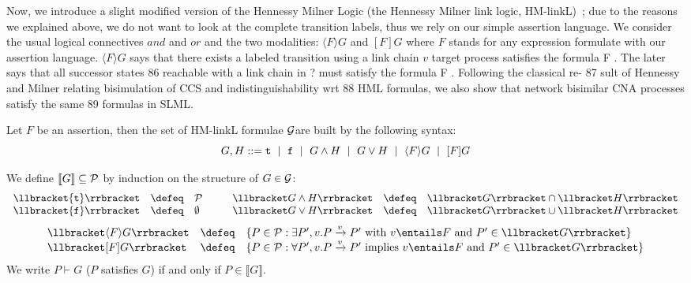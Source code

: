 Now, we introduce a slight modified version of the Hennessy Milner Logic (the Hennessy Milner link logic, HM-linkL)~\cite{}; due to the reasons we explained above, we do not want to look at the complete transition labels, thus we rely on our simple assertion language.
We consider the usual logical connectives $and$ and $or$
and the two modalities:  $\langle F \rangle G$ and $[F] G$ where $F$ stands for any
expression formulate with our assertion language.  $\langle F \rangle G$ says that there exists a 
labeled transition using a link chain $v$ 
target process satisfies the formula F . The later says that all successor states
86 reachable with a link chain in ? must satisfy the formula F . Following the classical re-
87 sult of Hennessy and Milner relating bisimulation of CCS and indistinguishability wrt
88 HML formulas, we also show that network bisimilar CNA processes satisfy the same
89 formulas in SLML.


\begin{definition}[HM-linkL]
Let   $F$ be an assertion, then 
the set of  HM-linkL formulae ${\cal G}$are built by the following syntax:\\
$$
G,H ::= {\tt t} ~\mid~ {\tt f} ~\mid~ G\wedge H ~\mid~ G \vee H ~\mid~ \langle F \rangle G ~\mid~ [F]G
$$
\end{definition}


\begin{definition}[semantics of $G$]
 We define $\llbracket G\rrbracket \subseteq {\cal P}$ by induction on the structure of $G \in {\cal G}$:%
\[
\begin{array}{ccl@{\hspace{1cm}}ccl}
 \llbracket {\tt t}\rrbracket &\defeq& {\cal P} &  \llbracket G\wedge H\rrbracket &\defeq&  \llbracket G\rrbracket  \cap \llbracket H\rrbracket  \\
\llbracket {\tt f}\rrbracket& \defeq& \emptyset &
  \llbracket G\vee H\rrbracket &\defeq&  \llbracket G\rrbracket  \cup \llbracket H\rrbracket \\
\end{array}
\]
\[
\begin{array}{lcl}
 \llbracket  \langle F \rangle G \rrbracket &\defeq& \{P \in {\cal P}: \exists P', v.P\xrightarrow{v}P' \mbox{ with } v \entails F \mbox{ and } P' \in  \llbracket  G \rrbracket\} \\
 \llbracket [F]G \rrbracket &\defeq& \{P \in {\cal P}: \forall P',v.P\xrightarrow{v}P' \mbox{ implies } v \entails F \mbox{ and } P' \in  \llbracket  G \rrbracket\}
\end{array}
\]
We write $P \vdash G$ ($P$ satisfies $G$) if and only if $P \in  \llbracket G \rrbracket$.
\end{definition}

